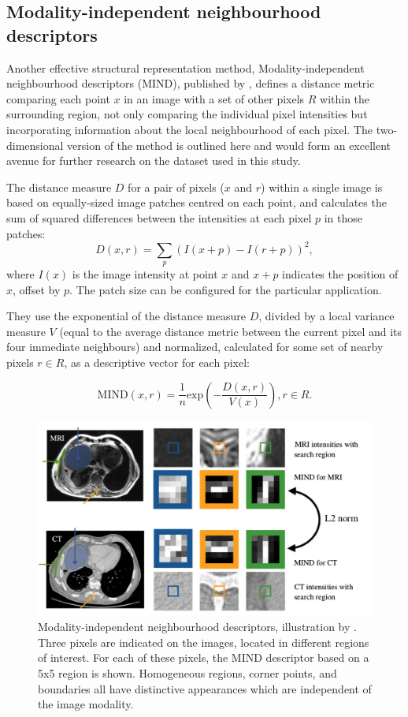 \documentclass{report}
\begin{document}
\subsection{Modality-independent neighbourhood descriptors}

Another effective structural representation method, Modality-independent neighbourhood descriptors (MIND), published by \cite{heinrich2012mind}, defines a distance metric comparing each point $x$ in an image with a set of other pixels $R$ within the surrounding region, not only comparing the individual pixel intensities but incorporating information about the local neighbourhood of each pixel. The two-dimensional version of the method is outlined here and would form an excellent avenue for further research on the dataset used in this study.
 
The distance measure $D$ for a pair of pixels ($x$ and $r$) within a single image is based on equally-sized image patches centred on each point, and calculates the sum of squared differences between the intensities at each pixel $p$ in those patches:
\[
D(x,r) = \sum_p (I(x+p)-I(r+p))^2,
\]
where $I(x)$ is the image intensity at point $x$ and $x+p$ indicates the position of $x$, offset by $p$. The patch size can be configured for the particular application. 

They use the exponential of the distance measure $D$, divided by a local variance measure $V$ (equal to the average distance metric between the current pixel and its four immediate neighbours) and normalized, calculated for some set of nearby pixels $r \in R$, as a descriptive vector for each pixel:

\[
\text{MIND}(x,r) = \frac{1}{n}\text{exp}\left( - \frac{D(x, r)}{V(x)} \right), r \in R.
\]

\begin{figure}
\centering
\includegraphics[width=5.5in]{mind_orig.pdf}
\caption{Modality-independent neighbourhood descriptors, illustration by \cite{heinrich2012mind}. Three pixels are indicated on the images, located in different regions of interest. For each of these pixels, the MIND descriptor based on a 5x5 region is shown. Homogeneous regions, corner points, and boundaries all have distinctive appearances which are independent of the image modality.}
\label{fig:MIND}
\end{figure}
\end{document}
